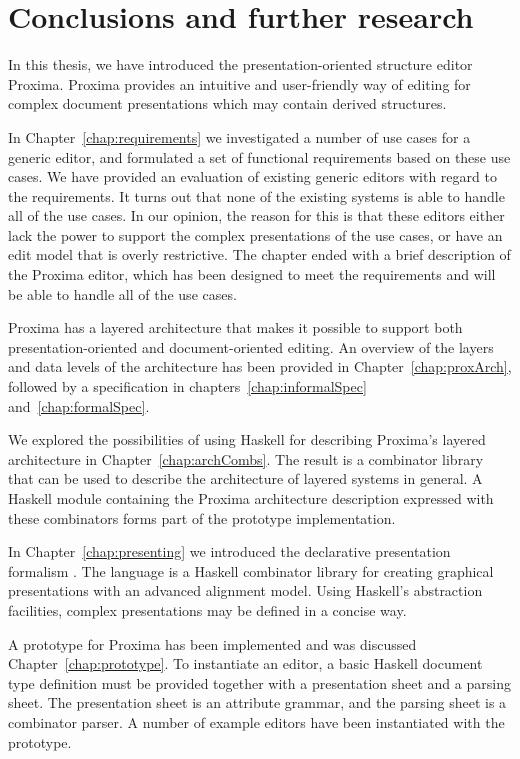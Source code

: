 \chapter{Conclusions and further research} \label{chap:conclusions}

In this thesis, we have introduced the presentation-oriented structure editor Proxima. Proxima provides an intuitive and user-friendly way of editing for complex document presentations which may contain derived structures.


In Chapter~\ref{chap:requirements} we investigated a number of use cases for a generic editor, and formulated a set of functional requirements based on these use cases. We have provided an evaluation of existing generic editors with regard to the requirements. It turns out that none of the existing systems is able to handle all of the use cases. In our opinion, the reason for this is that these editors either lack the power to support the complex presentations of the use cases, or have an edit model that is overly restrictive. The chapter ended with a brief description of the Proxima editor, which has been designed to meet the requirements and will be able to handle all of the use cases.

Proxima has a layered architecture that makes it possible to support both pre\-sen\-tation-oriented and document-oriented editing. An overview of the layers and data levels of the architecture has been provided in Chapter~\ref{chap:proxArch}, followed by a specification in chapters~\ref{chap:informalSpec} and~\ref{chap:formalSpec}. 

\bc We explored the possibilities of using Haskell for describing Proxima's layered architecture in Chapter~\ref{chap:archCombs}. The result is a combinator library that can be used to describe the architecture of layered systems in general. A Haskell module containing the Proxima architecture description expressed with these combinators forms part of the prototype implementation. \ec

In Chapter~\ref{chap:presenting} we introduced the declarative presentation formalism {\Xprez}. The language is a Haskell combinator library for creating graphical presentations with an advanced alignment model. Using Haskell's abstraction facilities, complex presentations may be defined in a concise way.

A prototype for Proxima  has been implemented and was discussed Chapter~\ref{chap:prototype}. To instantiate an editor, a basic Haskell document type definition must be provided together with a presentation sheet and a parsing sheet. The presentation sheet is an attribute grammar, and the parsing sheet is a combinator parser. A number of example editors have been instantiated with the prototype.


